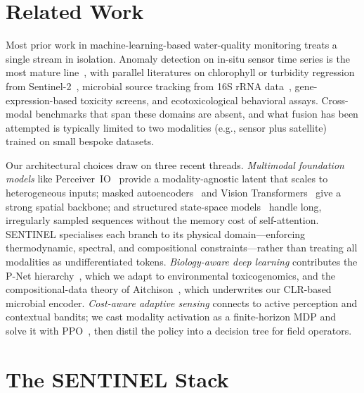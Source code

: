 \documentclass{article}
\begin{document}
\section{Related Work}
\label{sec:related}

Most prior work in machine-learning-based water-quality monitoring treats a single stream in isolation. Anomaly detection on in-situ sensor time series is the most mature line~\citep{olden2008ml_ecology, guidotti2024watermlsurvey}, with parallel literatures on chlorophyll or turbidity regression from Sentinel-2~\citep{drusch2012sentinel2}, microbial source tracking from 16S rRNA data~\citep{thompson2017earthmicrobiome}, gene-expression-based toxicity screens, and ecotoxicological behavioral assays. Cross-modal benchmarks that span these domains are absent, and what fusion has been attempted is typically limited to two modalities (e.g., sensor plus satellite) trained on small bespoke datasets.

Our architectural choices draw on three recent threads. \emph{Multimodal foundation models} like Perceiver~IO~\citep{jaegle2022perceiverio} provide a modality-agnostic latent that scales to heterogeneous inputs; masked autoencoders~\citep{he2022mae} and Vision Transformers~\citep{dosovitskiy2021vit} give a strong spatial backbone; and structured state-space models~\citep{gu2022s4, gu2024mamba} handle long, irregularly sampled sequences without the memory cost of self-attention. SENTINEL specialises each branch to its physical domain---enforcing thermodynamic, spectral, and compositional constraints---rather than treating all modalities as undifferentiated tokens. \emph{Biology-aware deep learning} contributes the P-Net hierarchy~\citep{elmarakeby2021pnet}, which we adapt to environmental toxicogenomics, and the compositional-data theory of Aitchison~\citep{aitchison1982}, which underwrites our CLR-based microbial encoder. \emph{Cost-aware adaptive sensing} connects to active perception and contextual bandits; we cast modality activation as a finite-horizon MDP and solve it with PPO~\citep{schulman2017ppo}, then distil the policy into a decision tree for field operators.

\section{The SENTINEL Stack}
\label{sec:method}
\end{document}
